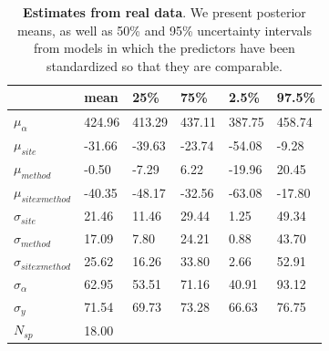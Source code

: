 \documentclass{article}\usepackage[]{graphicx}\usepackage[]{color}
\begin{document}
\begin{table}[ht]
\centering
\caption{\textbf{Estimates from real data}. We present posterior means, as well as 50\% and 95\% uncertainty intervals from models in which the predictors have been standardized so that they are comparable.} 
\label{tab:real}
\begingroup\footnotesize
\begin{tabular}{|p{}|p{}p{}p{}p{}p{}|}
  \hline
 & mean & 25\% & 75\% & 2.5\% & 97.5\% \\ 
  \hline
$\mu_{\alpha}$ & 424.96 & 413.29 & 437.11 & 387.75 & 458.74 \\ 
  $\mu_{site}$ & -31.66 & -39.63 & -23.74 & -54.08 & -9.28 \\ 
  $\mu_{method}$ & -0.50 & -7.29 & 6.22 & -19.96 & 20.45 \\ 
  $\mu_{sitexmethod}$ & -40.35 & -48.17 & -32.56 & -63.08 & -17.80 \\ 
  $\sigma_{site}$ & 21.46 & 11.46 & 29.44 & 1.25 & 49.34 \\ 
  $\sigma_{method}$ & 17.09 & 7.80 & 24.21 & 0.88 & 43.70 \\ 
  $\sigma_{sitexmethod}$ & 25.62 & 16.26 & 33.80 & 2.66 & 52.91 \\ 
  $\sigma_{\alpha}$ & 62.95 & 53.51 & 71.16 & 40.91 & 93.12 \\ 
  $\sigma_{y}$ & 71.54 & 69.73 & 73.28 & 66.63 & 76.75 \\ 
   \hline
$N_{sp}$ & 18.00 &  &  &  &  \\ 
   \hline
\end{tabular}
\endgroup
\end{table}

  
\end{document}
